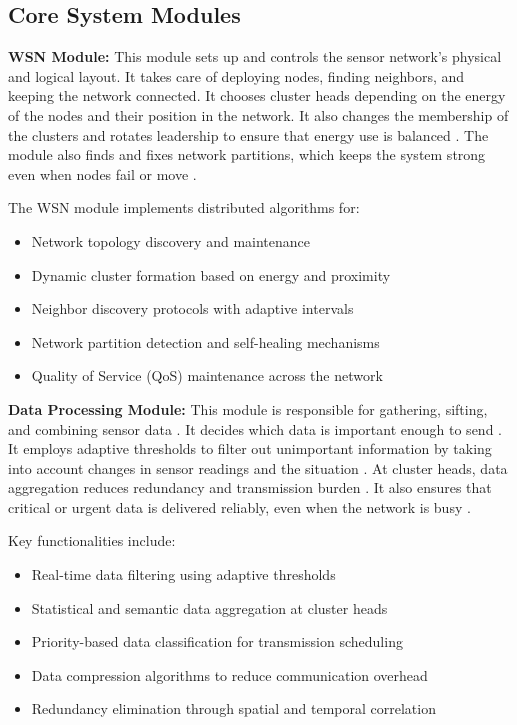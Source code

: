 \subsection{Core System Modules}

\textbf{WSN Module:}  
This module sets up and controls the sensor network's physical and logical layout. It takes care of deploying nodes, finding neighbors, and keeping the network connected. It chooses cluster heads \cite{abadi2022rlbeep, mutombo2021eer, 10717297} depending on the energy of the nodes and their position in the network. It also changes the membership of the clusters and rotates leadership to ensure that energy use is balanced \cite{8474286}. The module also finds and fixes network partitions, which keeps the system strong even when nodes fail or move \cite{YICK20082292}.

The WSN module implements distributed algorithms for:
\begin{itemize}
    \item Network topology discovery and maintenance
    \item Dynamic cluster formation based on energy and proximity
    \item Neighbor discovery protocols with adaptive intervals
    \item Network partition detection and self-healing mechanisms
    \item Quality of Service (QoS) maintenance across the network
\end{itemize}

\textbf{Data Processing Module:}  
This module is responsible for gathering, sifting, and combining sensor data \cite{8057520}. It decides which data is important enough to send \cite{AHMED2017242}. It employs adaptive thresholds to filter out unimportant information by taking into account changes in sensor readings and the situation \cite{8057520}. At cluster heads, data aggregation reduces redundancy and transmission burden \cite{moon2017}. It also ensures that critical or urgent data is delivered reliably, even when the network is busy \cite{10406923}.

Key functionalities include:
\begin{itemize}
    \item Real-time data filtering using adaptive thresholds
    \item Statistical and semantic data aggregation at cluster heads
    \item Priority-based data classification for transmission scheduling
    \item Data compression algorithms to reduce communication overhead
    \item Redundancy elimination through spatial and temporal correlation
\end{itemize}

